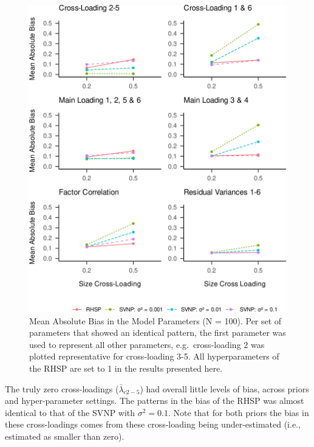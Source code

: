 \documentclass[
  man, donotrepeattitle,floatsintext]{apa6}
\begin{document}
\begin{figure}
\centering
\includegraphics{JMBKoch_thesis_files/figure-latex/unnamed-chunk-5-1.pdf}
\caption{\label{fig:unnamed-chunk-5}Mean Absolute Bias in the Model Parameters (N = 100). Per set of parameters that showed an identical pattern, the first parameter was used to represent all other parameters, e.g.~cross-loading 2 was plotted representative for cross-loading 3-5. All hyperparameters of the RHSP are set to 1 in the results presented here.}
\end{figure}

The truly zero cross-loadings (\(\bar{\lambda}_{c 2-5}\)) had overall little levels of bias, across priors and hyper-parameter settings. The patterns in the bias of the RHSP was almost identical to that of the SVNP with \(\sigma^2 = 0.1\). Note that for both priors the bias in these cross-loadings comes from these cross-loading being under-estimated (i.e., estimated as smaller than zero).
\end{document}
